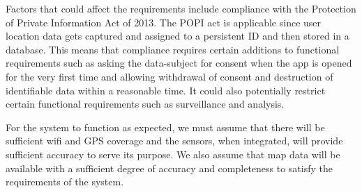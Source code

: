 Factors that could affect the requirements include compliance with the Protection of Private Information Act of 2013. The POPI act is applicable since user location data gets captured and assigned to a persistent ID and then stored in a database. This means that compliance requires certain additions to functional requirements such as asking the data-subject for consent when the app is opened for the very first time and allowing withdrawal of consent and destruction of identifiable data within a reasonable time. It could also potentially restrict certain functional requirements such as surveillance and analysis.
\par
\bigskip
\noindent
For the system to function as expected, we must assume that there will be sufficient wifi and GPS coverage and the sensors, when integrated, will provide sufficient accuracy to serve its purpose. We also assume that map data will be available with a sufficient degree of accuracy and completeness to satisfy the requirements of the system.

